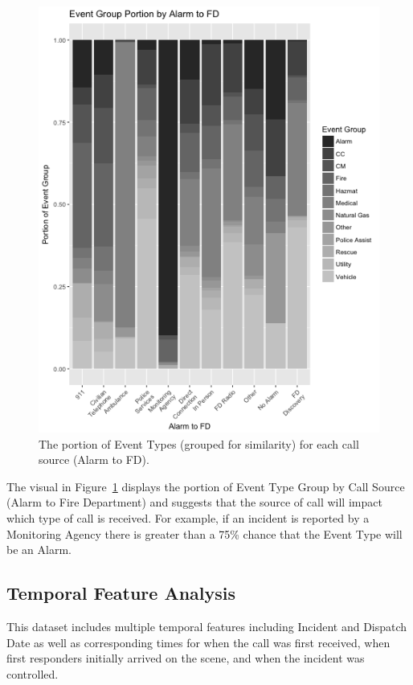 \documentclass[12pt,letterpaper, oneside]
{article}
\begin{document}
\begin{figure}
	
	\centering
		\includegraphics[width=\textwidth]{event-group-portion_vs_alarm-to-fd-BW}
		\caption{The portion of Event Types (grouped for similarity) for each call source (Alarm to FD).
			\label{fig:event-alarm}
		}
\end{figure} 

The visual in Figure~\ref{fig:event-alarm} displays the portion of Event Type Group by Call Source (Alarm to Fire Department) and suggests that the source of call will impact which type of call is received. For example, if an incident is reported by a Monitoring Agency there is greater than a 75\% chance that the Event Type will be an Alarm.


\subsection{Temporal Feature Analysis}
This dataset includes multiple temporal features including Incident and Dispatch Date as well as corresponding times for when the call was first received, when first responders initially arrived on the scene, and when the incident was controlled. 
\end{document}
